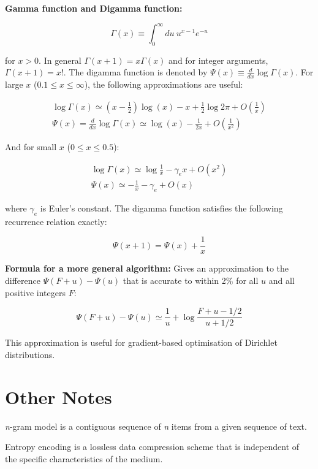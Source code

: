 \textbf{Gamma function and Digamma function: }

\begin{equation}
\Gamma(x)\equiv\int_{0}^{\infty}du\ u^{x-1}e^{-u}
\end{equation}

\noindent for $x>0$. In general $\Gamma(x+1)=x\Gamma(x)$ and for integer arguments, $\Gamma(x+1)=x!$. The digamma function is denoted by $\Psi(x)\equiv\frac{d}{dx}\log\Gamma(x)$. For large $x$ ($0.1\leq x \leq \infty$), the following approximations are useful:

\begin{equation}
\begin{split}
\log\Gamma(x) \simeq (x-\frac{1}{2})\log(x)-x+\frac{1}{2}\log2\pi+O(\frac{1}{x})
\\
\Psi(x) = \frac{d}{dx}\log\Gamma(x)\simeq \log(x)-\frac{1}{2x}+O(\frac{1}{x^{2}})
\end{split}
\end{equation}

\noindent And for small $x$ ($0\leq x \leq 0.5$):

\begin{equation}
\begin{split}
\log \Gamma(x) \simeq \log\frac{1}{x}-\gamma_{e}x+O(x^{2})
\\
\Psi(x)\simeq-\frac{1}{x}-\gamma_{e}+O(x)
\end{split}
\end{equation}

\noindent where $\gamma_{e}$ is Euler's constant. The digamma function satisfies the following recurrence relation exactly:

\begin{equation}
\Psi(x+1)=\Psi(x)+\frac{1}{x}
\end{equation}

\textbf{Formula for a more general algorithm: }Gives an approximation to the difference $\Psi(F+u)-\Psi(u)$ that is accurate to within 2\% for all $u$ and all positive integers $F$:

\begin{equation}
\Psi(F+u)-\Psi(u)\simeq\frac{1}{u}+\log\frac{F+u-1/2}{u+1/2}
\end{equation}

\noindent This approximation is useful for gradient-based optimisation of Dirichlet distributions.

\section{Other Notes}

\textit{n}-gram model is a contiguous sequence of \textit{n} items from a given sequence of text.

\null
\noindent Entropy encoding is a lossless data compression scheme that is independent of the specific characteristics of the medium.

